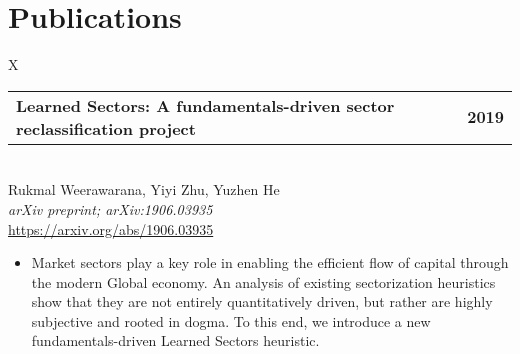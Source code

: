 \documentclass[10pt]{article}
\newcommand{\tabularxwidth}{\textwidth}
\begin{document}

    
        \section{Publications}

    
        \begin{minipage}{\tabularxwidth}
        \begin{tabularx}{\tabularxwidth}{X}
            {
                \begin{tabularx}{\tabularxwidth}{@{}X r}
                    \textbf{Learned Sectors: A fundamentals-driven sector reclassification project} &
                    \textbf{
        2019} \\
                \end{tabularx}
            } \\
            Rukmal Weerawarana, Yiyi Zhu, Yuzhen He \\

            
                \textit{arXiv preprint; arXiv:1906.03935} \\
            
            
                \url{https://arxiv.org/abs/1906.03935} \\
            
            
        \end{tabularx}

        \begin{itemize}[noitemsep, topsep=3pt, parsep=0pt, partopsep=0pt]
            
                \item 
    Market sectors play a key role in enabling the efficient flow of capital through the modern Global economy. An analysis of existing sectorization heuristics show that they are not entirely quantitatively driven, but rather are highly subjective and rooted in dogma. To this end, we introduce a new fundamentals-driven Learned Sectors heuristic.
            

\end{itemize}
\end{minipage}
\end{document}
